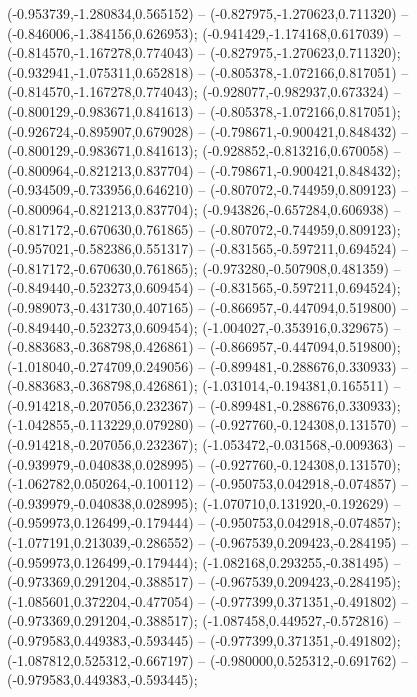  (-0.953739,-1.280834,0.565152) -- (-0.827975,-1.270623,0.711320) -- (-0.846006,-1.384156,0.626953);
 (-0.941429,-1.174168,0.617039) -- (-0.814570,-1.167278,0.774043) -- (-0.827975,-1.270623,0.711320);
 (-0.932941,-1.075311,0.652818) -- (-0.805378,-1.072166,0.817051) -- (-0.814570,-1.167278,0.774043);
 (-0.928077,-0.982937,0.673324) -- (-0.800129,-0.983671,0.841613) -- (-0.805378,-1.072166,0.817051);
 (-0.926724,-0.895907,0.679028) -- (-0.798671,-0.900421,0.848432) -- (-0.800129,-0.983671,0.841613);
 (-0.928852,-0.813216,0.670058) -- (-0.800964,-0.821213,0.837704) -- (-0.798671,-0.900421,0.848432);
 (-0.934509,-0.733956,0.646210) -- (-0.807072,-0.744959,0.809123) -- (-0.800964,-0.821213,0.837704);
 (-0.943826,-0.657284,0.606938) -- (-0.817172,-0.670630,0.761865) -- (-0.807072,-0.744959,0.809123);
 (-0.957021,-0.582386,0.551317) -- (-0.831565,-0.597211,0.694524) -- (-0.817172,-0.670630,0.761865);
 (-0.973280,-0.507908,0.481359) -- (-0.849440,-0.523273,0.609454) -- (-0.831565,-0.597211,0.694524);
 (-0.989073,-0.431730,0.407165) -- (-0.866957,-0.447094,0.519800) -- (-0.849440,-0.523273,0.609454);
 (-1.004027,-0.353916,0.329675) -- (-0.883683,-0.368798,0.426861) -- (-0.866957,-0.447094,0.519800);
 (-1.018040,-0.274709,0.249056) -- (-0.899481,-0.288676,0.330933) -- (-0.883683,-0.368798,0.426861);
 (-1.031014,-0.194381,0.165511) -- (-0.914218,-0.207056,0.232367) -- (-0.899481,-0.288676,0.330933);
 (-1.042855,-0.113229,0.079280) -- (-0.927760,-0.124308,0.131570) -- (-0.914218,-0.207056,0.232367);
 (-1.053472,-0.031568,-0.009363) -- (-0.939979,-0.040838,0.028995) -- (-0.927760,-0.124308,0.131570);
 (-1.062782,0.050264,-0.100112) -- (-0.950753,0.042918,-0.074857) -- (-0.939979,-0.040838,0.028995);
 (-1.070710,0.131920,-0.192629) -- (-0.959973,0.126499,-0.179444) -- (-0.950753,0.042918,-0.074857);
 (-1.077191,0.213039,-0.286552) -- (-0.967539,0.209423,-0.284195) -- (-0.959973,0.126499,-0.179444);
 (-1.082168,0.293255,-0.381495) -- (-0.973369,0.291204,-0.388517) -- (-0.967539,0.209423,-0.284195);
 (-1.085601,0.372204,-0.477054) -- (-0.977399,0.371351,-0.491802) -- (-0.973369,0.291204,-0.388517);
 (-1.087458,0.449527,-0.572816) -- (-0.979583,0.449383,-0.593445) -- (-0.977399,0.371351,-0.491802);
 (-1.087812,0.525312,-0.667197) -- (-0.980000,0.525312,-0.691762) -- (-0.979583,0.449383,-0.593445);
